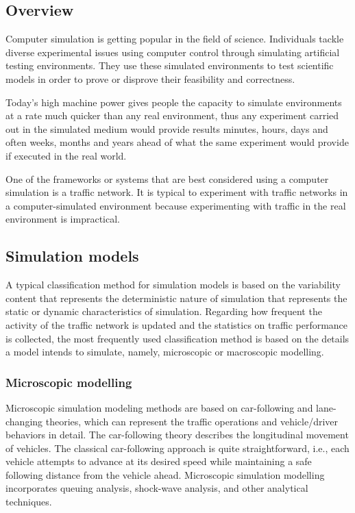 \subsection{Overview}
	Computer simulation is getting popular in the field of science. Individuals tackle diverse experimental issues using computer control through simulating artificial testing environments. They use these simulated environments to test scientific models in order to prove or disprove their feasibility and correctness.
	 
	Today's high machine power gives people the capacity to simulate environments at a rate much quicker than any real environment, thus any experiment carried out in the simulated medium would provide results minutes, hours, days and often weeks, months and years ahead of what the same experiment would provide if executed in the real world.
	
	One of the frameworks or systems that are best considered using a computer simulation is a traffic network. It is typical to experiment with traffic networks in a computer-simulated environment because experimenting with traffic in the real environment is impractical. 

\subsection{Simulation models}
	A typical classification method for simulation models is based on the variability content that represents the deterministic nature of simulation that represents the static or dynamic characteristics of simulation. Regarding how frequent the activity of the traffic network is updated and the statistics on traffic performance is collected, the most frequently used classification method is based on the details a model intends to simulate, namely, microscopic or macroscopic modelling.
\subsubsection{Microscopic modelling}
	Microscopic simulation modeling methods are based on car-following and lane-changing theories, which can represent the traffic operations and vehicle/driver behaviors in detail. The car-following theory describes the longitudinal movement of vehicles. The classical car-following approach is quite straightforward, i.e., each vehicle attempts to advance at its desired speed while maintaining a safe following distance from the vehicle ahead\cite{rathi1986freesim}. Microscopic simulation modelling incorporates queuing analysis, shock-wave analysis, and other analytical techniques.
